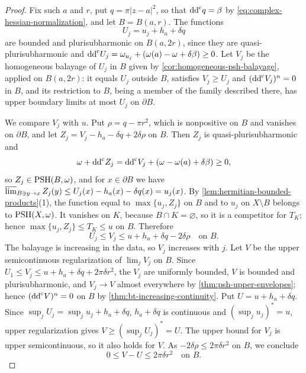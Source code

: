 \begin{proof}
Fix such $a$ and $r$, put $q=\pi|z-a|^2$, so that $\mathrm{dd}^{\mathrm{c}} q=\beta$ by \eqref{eq:complex-hessian-normalization}, and let $B=B(a,r)$. The functions
\[
 U_j=u_j+h_a+\delta q
\]
are bounded and plurisubharmonic on $B(a,2r)$, since they are quasi-plurisubharmonic and $\mathrm{dd}^{\mathrm{c}} U_j=\omega_{u_j}+(\omega(a)-\omega+\delta\beta)\geq0$. Let $V_j$ be the homogeneous balayage of $U_j$ in $B$ given by \cref{cor:homogeneous-psh-balayage}, applied on $B(a,2r)$: it equals $U_j$ outside $B$, satisfies $V_j\geq U_j$ and $(\mathrm{dd}^{\mathrm{c}} V_j)^n=0$ in $B$, and its restriction to $B$, being a member of the family described there, has upper boundary limits at most $U_j$ on $\partial B$.

We compare $V_j$ with $u$. Put $\rho=q-\pi r^2$, which is nonpositive on $B$ and vanishes on $\partial B$, and let $Z_j=V_j-h_a-\delta q+2\delta\rho$ on $B$. Then $Z_j$ is quasi-plurisubharmonic and
\[
 \omega+\mathrm{dd}^{\mathrm{c}} Z_j=\mathrm{dd}^{\mathrm{c}} V_j+(\omega-\omega(a)+\delta\beta)\geq0,
\]
so $Z_j\in\mathrm{PSH}(B,\omega)$, and for $x\in\partial B$ we have $\varlimsup_{B\ni y\to x}Z_j(y)\leq U_j(x)-h_a(x)-\delta q(x)=u_j(x)$. By \cref{lem:hermitian-bounded-products}(1), the function equal to $\max\{u_j,Z_j\}$ on $B$ and to $u_j$ on $X\setminus B$ belongs to $\mathrm{PSH}(X,\omega)$. It vanishes on $K$, because $B\cap K=\varnothing$, so it is a competitor for $T_K$; hence $\max\{u_j,Z_j\}\leq T_K\leq u$ on $B$. Therefore
\[
 U_j\leq V_j\leq u+h_a+\delta q-2\delta\rho\quad\text{on }B.
\]
The balayage is increasing in the data, so $V_j$ increases with $j$. Let $V$ be the upper semicontinuous regularization of $\lim_jV_j$ on $B$. Since $U_1\leq V_j\leq u+h_a+\delta q+2\pi\delta r^2$, the $V_j$ are uniformly bounded, $V$ is bounded and plurisubharmonic, and $V_j\to V$ almost everywhere by \cref{thm:psh-upper-envelopes}; hence $(\mathrm{dd}^{\mathrm{c}} V)^n=0$ on $B$ by \cref{thm:bt-increasing-continuity}. Put $U=u+h_a+\delta q$. Since $\sup_jU_j=\sup_ju_j+h_a+\delta q$, $h_a+\delta q$ is continuous and $(\sup_ju_j)^*=u$, upper regularization gives $V\geq(\sup_jU_j)^*=U$. The upper bound for $V_j$ is upper semicontinuous, so it also holds for $V$. As $-2\delta\rho\leq2\pi\delta r^2$ on $B$, we conclude
\begin{equation}\label{eq:hermitian-frozen-balayage-error}
                  0\leq V-U\leq2\pi\delta r^2\quad\text{on }B.
\end{equation}


\end{proof}
